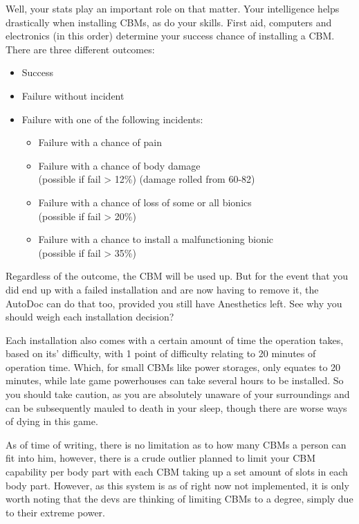 Well, your stats play an important role on that matter. Your intelligence helps drastically when installing CBMs, as do your skills. First aid, computers and electronics (in this order) determine your success chance of installing a CBM. There are three different outcomes:

\begin{itemize}
\item Success
\item Failure without incident
\item Failure with one of the following incidents:
\begin{itemize}
\item Failure with a chance of pain
\item Failure with a chance of body damage\\(possible if fail > 12\%) (damage rolled from 60-82)
\item Failure with a chance of loss of some or all bionics\\(possible if fail > 20\%)
\item Failure with a chance to install a malfunctioning bionic\\ (possible if fail > 35\%)
\end{itemize}
\end{itemize}
    
Regardless of the outcome, the CBM will be used up. But for the event that you did end up with a failed installation and are now having to remove it, the AutoDoc can do that too, provided you still have Anesthetics left. See why you should weigh each installation decision?

Each installation also comes with a certain amount of time the operation takes, based on its' difficulty, with 1 point of difficulty relating to 20 minutes of operation time. Which, for small CBMs like power storages, only equates to 20 minutes, while late game powerhouses can take several hours to be installed. So you should take caution, as you are absolutely unaware of your surroundings and can be subsequently mauled to death in your sleep, though there are worse ways of dying in this game.

As of time of writing, there is no limitation as to how many CBMs a person can fit into him, however, there is a crude outlier planned to limit your CBM capability per body part with each CBM taking up a set amount of slots in each body part. However, as this system is as of right now not implemented, it is only worth noting that the devs are thinking of limiting CBMs to a degree, simply due to their extreme power.

